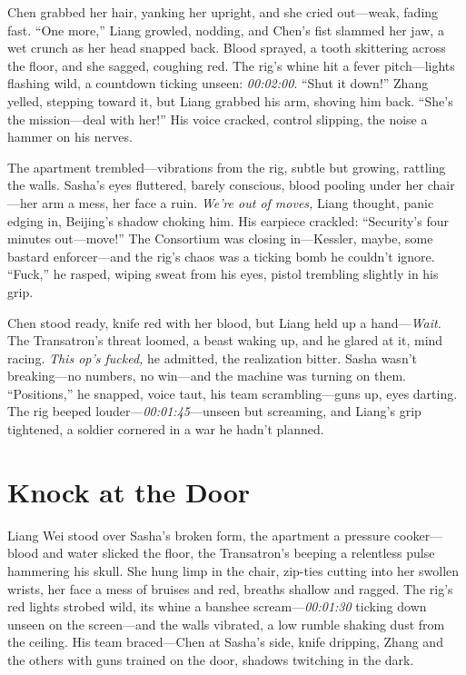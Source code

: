 \documentclass[12pt]{book}
\begin{document}
Chen grabbed her hair, yanking her upright, and she cried out—weak, fading fast. “One more,” Liang growled, nodding, and Chen’s fist slammed her jaw, a wet crunch as her head snapped back. Blood sprayed, a tooth skittering across the floor, and she sagged, coughing red. The rig’s whine hit a fever pitch—lights flashing wild, a countdown ticking unseen: \textit{00:02:00}. “Shut it down!” Zhang yelled, stepping toward it, but Liang grabbed his arm, shoving him back. “She’s the mission—deal with her!” His voice cracked, control slipping, the noise a hammer on his nerves.

The apartment trembled—vibrations from the rig, subtle but growing, rattling the walls. Sasha’s eyes fluttered, barely conscious, blood pooling under her chair—her arm a mess, her face a ruin. \textit{We’re out of moves,} Liang thought, panic edging in, Beijing’s shadow choking him. His earpiece crackled: “Security’s four minutes out—move!” The Consortium was closing in—Kessler, maybe, some bastard enforcer—and the rig’s chaos was a ticking bomb he couldn’t ignore. “Fuck,” he rasped, wiping sweat from his eyes, pistol trembling slightly in his grip.

Chen stood ready, knife red with her blood, but Liang held up a hand—\textit{Wait.} The Transatron’s threat loomed, a beast waking up, and he glared at it, mind racing. \textit{This op’s fucked,} he admitted, the realization bitter. Sasha wasn’t breaking—no numbers, no win—and the machine was turning on them. “Positions,” he snapped, voice taut, his team scrambling—guns up, eyes darting. The rig beeped louder—\textit{00:01:45}—unseen but screaming, and Liang’s grip tightened, a soldier cornered in a war he hadn’t planned.

\section{Knock at the Door}

Liang Wei stood over Sasha’s broken form, the apartment a pressure cooker—blood and water slicked the floor, the Transatron’s beeping a relentless pulse hammering his skull. She hung limp in the chair, zip-ties cutting into her swollen wrists, her face a mess of bruises and red, breaths shallow and ragged. The rig’s red lights strobed wild, its whine a banshee scream—\textit{00:01:30} ticking down unseen on the screen—and the walls vibrated, a low rumble shaking dust from the ceiling. His team braced—Chen at Sasha’s side, knife dripping, Zhang and the others with guns trained on the door, shadows twitching in the dark.
\end{document}

